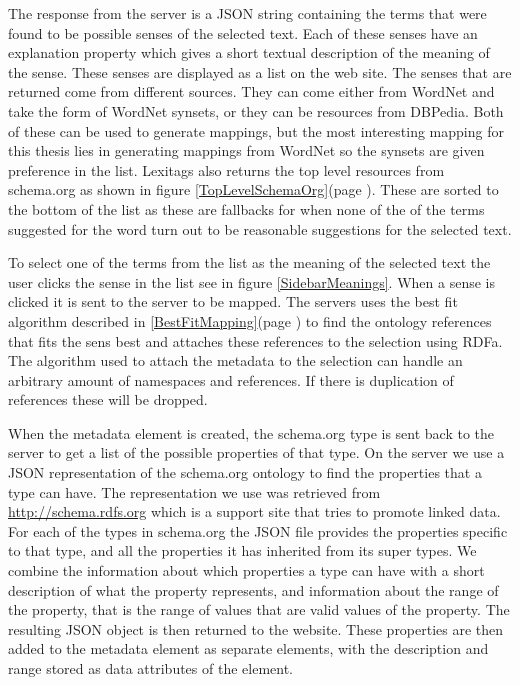 The response from the server is a JSON string containing the terms that were found to be possible senses of the selected text.
Each of these senses have an explanation property which gives a short textual description of the meaning of the sense.
These senses are displayed as a list on the web site.
The senses that are returned come from different sources.
They can come either from WordNet and take the form of WordNet synsets, or they can be resources from DBPedia.
Both of these can be used to generate mappings,
but the most interesting mapping for this thesis lies in generating mappings from WordNet so the synsets are given preference in the list.
Lexitags also returns the top level resources from schema.org as shown in figure \ref{TopLevelSchemaOrg}(page \pageref{TopLevelSchemaOrg}).
These are sorted to the bottom of the list as these are fallbacks for when none of the of the terms suggested for
the word turn out to be reasonable suggestions for the selected text.

To select one of the terms from the list as the meaning of the selected text the user clicks the sense in the list see in
figure \ref{SidebarMeanings}.
When a sense is clicked it is sent to the server to be mapped.
The servers uses the best fit algorithm described in \ref{BestFitMapping}(page \pageref{BestFitMapping}) to find the ontology references
that fits the sens best and attaches these references to the selection using RDFa.
The algorithm used to attach the metadata to the selection can handle an arbitrary amount of namespaces and references.
If there is duplication of references these will be dropped.

When the metadata element is created,
the schema.org type is sent back to the server to get a list of the possible properties of that type.
On the server we use a JSON representation of the schema.org ontology to find the properties that a type can have.
The representation we use was retrieved from \url{http://schema.rdfs.org} which is a support site that tries to
promote linked data.
For each of the types in schema.org the JSON file provides the properties specific to that type,
and all the properties it has inherited from its super types.
We combine the information about which properties a type can have with a short description of what the property represents,
and information about the range of the property, that is the range of values that are valid values of the property.
The resulting JSON object is then returned to the website.
These properties are then added to the metadata element as separate elements,
with the description and range stored as data attributes of the element.


